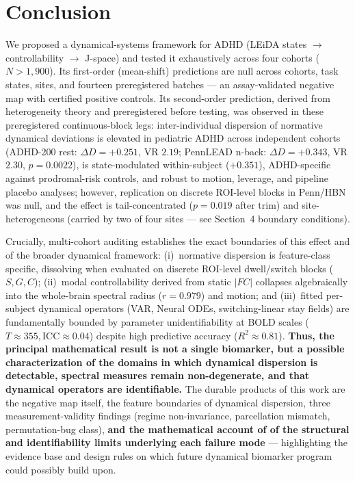 \documentclass{article}
\begin{document}
\section{Conclusion}

We proposed a dynamical-systems framework for ADHD (LEiDA states $\to$ controllability $\to$ J-space) and tested it exhaustively across four cohorts ($N > 1{,}900$). Its first-order (mean-shift) predictions are null across cohorts, task states, sites, and fourteen preregistered batches --- an assay-validated negative map with certified positive controls. Its second-order prediction, derived from heterogeneity theory and preregistered before testing, was observed in these preregistered continuous-block legs: inter-individual dispersion of normative dynamical deviations is elevated in pediatric ADHD across independent cohorts (ADHD-200 rest: $\Delta D{=}{+}0.251$, VR $2.19$; PennLEAD n-back: $\Delta D{=}{+}0.343$, VR $2.30$, $p{=}0.0022$), is state-modulated within-subject ($+0.351$), ADHD-specific against prodromal-risk controls, and robust to motion, leverage, and pipeline placebo analyses; however, replication on discrete ROI-level blocks in Penn/HBN was null, and the effect is tail-concentrated ($p{=}0.019$ after trim) and site-heterogeneous (carried by two of four sites --- see Section~4 boundary conditions).

Crucially, multi-cohort auditing establishes the exact boundaries of this effect and of the broader dynamical framework: (i)~normative dispersion is feature-class specific, dissolving when evaluated on discrete ROI-level dwell/switch blocks ($S, G, C$); (ii)~modal controllability derived from static $|FC|$ collapses algebraically into the whole-brain spectral radius ($r{=}0.979$) and motion; and (iii)~fitted per-subject dynamical operators (VAR, Neural ODEs, switching-linear stay fields) are fundamentally bounded by parameter unidentifiability at BOLD scales ($T \approx 355, \mathrm{ICC} \approx 0.04$) despite high predictive accuracy ($R^2 \approx 0.81$). \textbf{Thus, the principal mathematical result is not a single biomarker, but a possible characterization of the domains in which dynamical dispersion is detectable, spectral measures remain non-degenerate, and that dynamical operators are identifiable.} The durable products of this work are the negative map itself, the feature boundaries of dynamical dispersion, three measurement-validity findings (regime non-invariance, parcellation mismatch, permutation-bug class), \textbf{and the mathematical account of of the structural and identifiability limits underlying each failure mode} --- highlighting the evidence base and design rules on which future dynamical biomarker program could possibly build upon.
\end{document}
